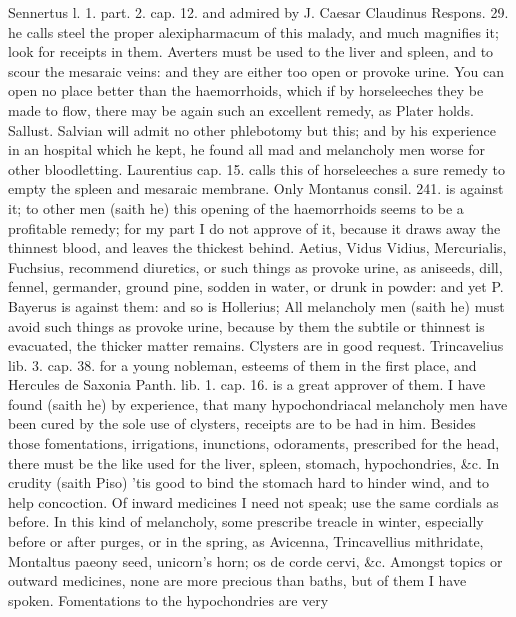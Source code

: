 Sennertus l. 1. part. 2. cap. 12. and admired by J. Caesar Claudinus
Respons. 29. he calls steel the proper alexipharmacum of this
malady, and much magnifies it; look for receipts in them. Averters must
be used to the liver and spleen, and to scour the mesaraic veins: and
they are either too open or provoke urine. You can open no place better
than the haemorrhoids, which if by horseleeches they be made to flow,
there may be again such an excellent remedy, as Plater holds.
Sallust. Salvian will admit no other phlebotomy but this; and by his
experience in an hospital which he kept, he found all mad and
melancholy men worse for other bloodletting. Laurentius cap. 15. calls
this of horseleeches a sure remedy to empty the spleen and mesaraic
membrane. Only Montanus consil. 241. is against it;  to other men
(saith he) this opening of the haemorrhoids seems to be a profitable
remedy; for my part I do not approve of it, because it draws away the
thinnest blood, and leaves the thickest behind.
Aetius, Vidus Vidius, Mercurialis, Fuchsius, recommend diuretics, or
such things as provoke urine, as aniseeds, dill, fennel, germander,
ground pine, sodden in water, or drunk in powder: and yet P.
Bayerus is against them: and so is Hollerius; All melancholy men (saith
he) must avoid such things as provoke urine, because by them the
subtile or thinnest is evacuated, the thicker matter remains.
Clysters are in good request. Trincavelius lib. 3. cap. 38. for a young
nobleman, esteems of them in the first place, and Hercules de Saxonia
Panth. lib. 1. cap. 16. is a great approver of them. I have found
(saith he) by experience, that many hypochondriacal melancholy men have
been cured by the sole use of clysters, receipts are to be had in him.
Besides those fomentations, irrigations, inunctions, odoraments,
prescribed for the head, there must be the like used for the liver,
spleen, stomach, hypochondries, \&c. In crudity (saith Piso) 'tis
good to bind the stomach hard to hinder wind, and to help concoction.
Of inward medicines I need not speak; use the same cordials as before.
In this kind of melancholy, some prescribe treacle in winter,
especially before or after purges, or in the spring, as Avicenna,
 Trincavellius mithridate, Montaltus paeony seed, unicorn's
horn; os de corde cervi, \&c.
Amongst topics or outward medicines, none are more precious than baths,
but of them I have spoken. Fomentations to the hypochondries are very
